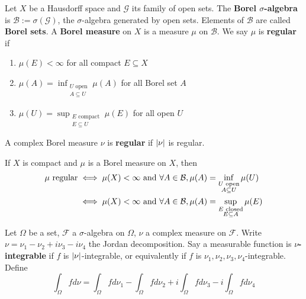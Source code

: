 \documentclass{article}
\begin{document}
\begin{defi}
  Let $X$ be a Hausdorff space and $\mathcal G$ its family of open sets. The {\bf Borel $\sigma$-algebra} is $\mathcal B := \sigma(\mathcal G)$, the $\sigma$-algebra generated by open sets. Elements of $\mathcal B$ are called {\bf Borel sets}. A {\bf Borel measure} on $X$ is a measure $\mu$ on $\mathcal B$. We say $\mu$ is {\bf regular} if
  \begin{enumerate}
    \item $\mu(E) < \infty$ for all compact $E \subseteq X$
    \item $\mu(A) = \inf_{\substack{U \text{ open} \\ A \subseteq U}} \mu(A)$ for all Borel set $A$
    \item $\mu(U) = \sup_{\substack{E \text{ compact} \\ E \subseteq U}} \mu(E)$ for all open $U$
  \end{enumerate}
  A complex Borel measure $\nu$ is {\bf regular} if $\left\lvert \nu\right\rvert$ is regular.
\end{defi}

If $X$ is compact and $\mu$ is a Borel measure on $X$, then
\begin{align*}
  \mu \text{ regular}
  & \iff \mu(X) < \infty \text{ and } \forall A \in \mathcal B, \mu(A) = \inf_{\substack{U \text{ open} \\ A \subseteq U}} \mu(U) \\
  & \iff \mu(X) < \infty \text{ and } \forall A \in \mathcal B, \mu(A) = \sup_{\substack{E \text{ closed} \\ E \subseteq A}} \mu(E)
\end{align*}

\begin{defi}
  Let $\Omega$ be a set, $\mathcal F$ a $\sigma$-algebra on $\Omega$, $\nu$ a complex measure on $\mathcal F$. Write $\nu = \nu_1 - \nu_2 + i\nu_3 - i\nu_4$ the Jordan decomposition. Say a measurable function is {\bf $\nu$-integrable} if $f$ is $\left\lvert \nu\right\rvert$-integrable, or equivalently if $f$ is $\nu_1, \nu_2, \nu_3, \nu_4$-integrable. Define
  $$\int_\Omega f d\nu = \int_\Omega f d\nu_1 - \int_\Omega f d\nu_2 + i\int_\Omega f d\nu_3 - i\int_\Omega f d\nu_4$$
\end{defi}

\newlec
\end{document}

